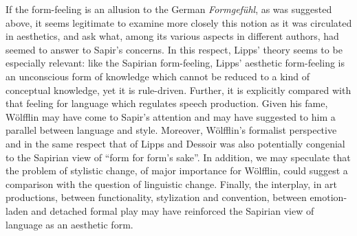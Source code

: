\documentclass[output=paper]{langscibook}
\begin{document}
If the form-feeling is an allusion to the German \emph{Formgefühl}, as was suggested above, it seems legitimate to examine more closely this notion as it was circulated in aesthetics, and ask what, among its various aspects in different authors, had seemed to answer to Sapir's concerns. In this respect, Lipps' theory seems to be especially relevant: like the Sapirian form-feeling, Lipps' aesthetic form-feeling is an unconscious form of knowledge which cannot be reduced to a kind of conceptual knowledge, yet it is rule-driven. Further, it is explicitly compared with that feeling for language which regulates speech production. Given his fame, Wölfflin may have come to Sapir's attention and may have suggested to him a parallel between language and style. Moreover, Wölfflin's formalist perspective and in the same respect that of Lipps and Dessoir was also potentially congenial to the Sapirian view of ``form for form’s sake''. In addition, we may speculate that the problem of stylistic change, of major importance for Wölfflin, could suggest a comparison with the question of linguistic change. Finally, the interplay, in art productions, between functionality, stylization and convention, between emotion-laden and detached formal play may have reinforced the Sapirian view of language as an aesthetic form.

\sloppy
\printbibliography[heading=subbibliography,notkeyword=this]
\end{document}
